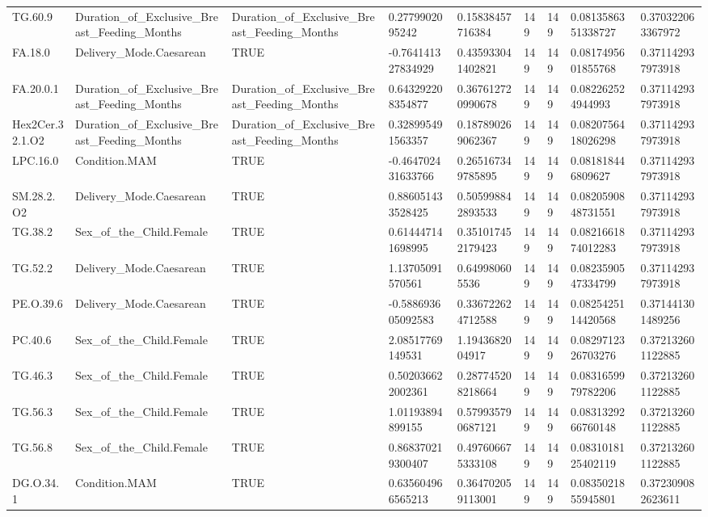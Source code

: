 \begin{longtable}{lllllllll}
TG.60.9 & Duration\_of\_Exclusive\_Breast\_Feeding\_Months & Duration\_of\_Exclusive\_Breast\_Feeding\_Months & 0.2779902095242 & 0.15838457716384 & 149 & 149 & 0.0813586351338727 & 0.370322063367972 \\
FA.18.0 & Delivery\_Mode.Caesarean & TRUE & -0.764141327834929 & 0.435933041402821 & 149 & 149 & 0.0817495601855768 & 0.371142937973918 \\
FA.20.0.1 & Duration\_of\_Exclusive\_Breast\_Feeding\_Months & Duration\_of\_Exclusive\_Breast\_Feeding\_Months & 0.643292208354877 & 0.367612720990678 & 149 & 149 & 0.082262524944993 & 0.371142937973918 \\
Hex2Cer.32.1.O2 & Duration\_of\_Exclusive\_Breast\_Feeding\_Months & Duration\_of\_Exclusive\_Breast\_Feeding\_Months & 0.328995491563357 & 0.187890269062367 & 149 & 149 & 0.0820756418026298 & 0.371142937973918 \\
LPC.16.0 & Condition.MAM & TRUE & -0.464702431633766 & 0.265167349785895 & 149 & 149 & 0.081818446809627 & 0.371142937973918 \\
SM.28.2.O2 & Delivery\_Mode.Caesarean & TRUE & 0.886051433528425 & 0.505998842893533 & 149 & 149 & 0.0820590848731551 & 0.371142937973918 \\
TG.38.2 & Sex\_of\_the\_Child.Female & TRUE & 0.614447141698995 & 0.351017452179423 & 149 & 149 & 0.0821661874012283 & 0.371142937973918 \\
TG.52.2 & Delivery\_Mode.Caesarean & TRUE & 1.13705091570561 & 0.649980605536 & 149 & 149 & 0.0823590547334799 & 0.371142937973918 \\
PE.O.39.6 & Delivery\_Mode.Caesarean & TRUE & -0.588693605092583 & 0.336722624712588 & 149 & 149 & 0.0825425114420568 & 0.371441301489256 \\
PC.40.6 & Sex\_of\_the\_Child.Female & TRUE & 2.08517769149531 & 1.1943682004917 & 149 & 149 & 0.0829712326703276 & 0.372132601122885 \\
TG.46.3 & Sex\_of\_the\_Child.Female & TRUE & 0.502036622002361 & 0.287745208218664 & 149 & 149 & 0.0831659979782206 & 0.372132601122885 \\
TG.56.3 & Sex\_of\_the\_Child.Female & TRUE & 1.01193894899155 & 0.579935790687121 & 149 & 149 & 0.0831329266760148 & 0.372132601122885 \\
TG.56.8 & Sex\_of\_the\_Child.Female & TRUE & 0.868370219300407 & 0.497606675333108 & 149 & 149 & 0.0831018125402119 & 0.372132601122885 \\
DG.O.34.1 & Condition.MAM & TRUE & 0.635604966565213 & 0.364702059113001 & 149 & 149 & 0.0835021855945801 & 0.372309082623611 \\

\end{longtable}

